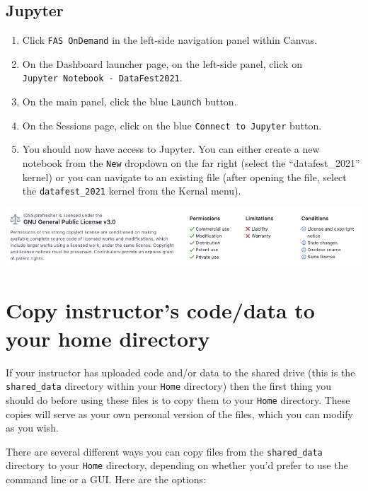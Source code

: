 \documentclass[]{book}
\providecommand{\tightlist}{%
  \setlength{\itemsep}{0pt}\setlength{\parskip}{0pt}}
\begin{document}
\hypertarget{jupyter}{%
\section{Jupyter}\label{jupyter}}

\begin{enumerate}
\def\labelenumi{\arabic{enumi}.}
\tightlist
\item
  Click \texttt{FAS\ OnDemand} in the left-side navigation panel within Canvas.
\item
  On the Dashboard launcher page, on the left-side panel, click on \texttt{Jupyter\ Notebook\ -\ DataFest2021}.
\item
  On the main panel, click the blue \texttt{Launch} button.
\item
  On the Sessions page, click on the blue \texttt{Connect\ to\ Jupyter} button.
\item
  You should now have access to Jupyter. You can either create a new notebook from the \texttt{New} dropdown on the far right (select the ``datafest\_2021'' kernel) or you can navigate to an existing file (after opening the file, select the \texttt{datafest\_2021} kernel from the Kernal menu).
\end{enumerate}

\includegraphics{images/readme-license.png}

\hypertarget{copy-instructors-codedata-to-your-home-directory}{%
\chapter{Copy instructor's code/data to your home directory}\label{copy-instructors-codedata-to-your-home-directory}}

If your instructor has uploaded code and/or data to the shared drive (this is the \texttt{shared\_data} directory within your \texttt{Home} directory) then the first thing you should do before using these files is to copy them to your \texttt{Home} directory. These copies will serve as your own personal version of the files, which you can modify as you wish.

There are several different ways you can copy files from the \texttt{shared\_data} directory to your \texttt{Home} directory, depending on whether you'd prefer to use the command line or a GUI. Here are the options:
\end{document}

